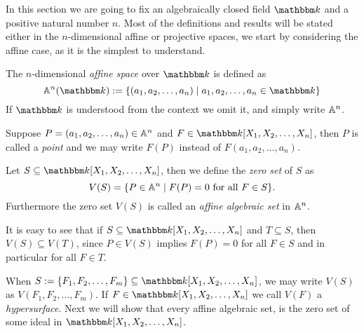 In this section we are going to fix an algebraically closed field $\K$ and a positive natural number $n$. Most of the definitions and results will be stated either in the $n$-dimensional affine or projective spaces, we start by considering the affine case, as it is the simplest to understand.

\begin{definition}
  The $n$-dimensional \textit{affine space} over $\K$ is defined as
  \begin{equation*}
    \A^{n}(\K) := \{(a_{1}, a_{2},\ldots, a_{n}) \;\vert\; a_1, a_2, \ldots, a_{n} \in \K\}
  \end{equation*}
  If $\K$ is understood from the context we omit it, and simply write $\mathbb{A}^{n}$.
\end{definition}

Suppose $P = (a_{1}, a_{2}, \ldots, a_{n}) \in \mathbb{A}^{n}$ and $F \in \pols$, then $P$ is called a \textit{point} and we may write $F(P)$ instead of $F(a_{1}, a_{2}, \ldots, a_{n})$.

\begin{definition}\label{def:alg_set}
  Let $S \subseteq \pols$, then we define the \textit{zero set} of $S$ as
  \begin{equation*}
    V(S) = \{P \in \mathbb{A}^{n} \mid F(P) = 0 \text{ for all }  F \in S\}.
  \end{equation*}
  Furthermore the zero set $V(S)$ is called an \textit{affine algebraic set} in $\mathbb{A}^{n}$.
\end{definition}
\begin{remark}\label{rem:bigger_sets_lead_to_smaller_zero_sets}
  It is easy to see that if $S \subseteq \pols$ and $T \subseteq S$, then $V(S) \subseteq V(T)$, since $P \in V(S)$ implies $F(P) = 0$ for all $F \in S$ and in particular for all $F \in T$.
\end{remark}

When $S := \{F_{1}, F_{2}, \ldots, F_{m}\} \subseteq \pols$, we may write $V(S)$ as $V(F_{1}, F_{2}, \ldots, F_{m})$. If $F \in \pols$ we call $V(F)$ a \textit{hypersurface}. Next we will show that every affine algebraic set, is the zero set of some ideal in $\pols$.


